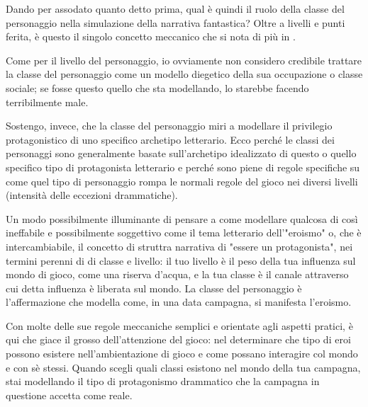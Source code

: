 Dando per assodato quanto detto prima, qual è quindi il ruolo della classe del personaggio nella simulazione della narrativa fantastica? Oltre a livelli e punti ferita, è questo il singolo concetto meccanico che si nota di più in \dnd{}.

Come per il livello del personaggio, io ovviamente non considero credibile trattare la classe del personaggio come un modello diegetico della sua occupazione o classe sociale; se fosse questo quello che sta modellando, lo starebbe facendo terribilmente male.

Sostengo, invece, che la classe del personaggio miri a modellare il privilegio protagonistico di uno specifico archetipo letterario. Ecco perché le classi dei personaggi sono generalmente basate sull'archetipo idealizzato di questo o quello specifico tipo di protagonista letterario e perché sono piene di regole specifiche su come quel tipo di personaggio rompa le normali regole del gioco nei diversi livelli (intensità delle eccezioni drammatiche).

Un modo possibilmente illuminante di pensare a come modellare qualcosa di così ineffabile e possibilmente soggettivo come il tema letterario dell'"eroismo" o, che è intercambiabile, il concetto di struttra narrativa di "essere un protagonista", nei termini perenni di \dnd{} di classe e livello: il tuo livello è il peso della tua influenza sul mondo di gioco, come una riserva d'acqua, e la tua classe è il canale attraverso cui detta influenza è liberata sul mondo. La classe del personaggio è l'affermazione che modella come, in una data campagna, si manifesta l'eroismo.

Con molte delle sue regole meccaniche semplici e orientate agli aspetti pratici, è qui che giace il grosso dell'attenzione del gioco: nel determinare che tipo di eroi possono esistere nell'ambientazione di gioco e come possano interagire col mondo e con sè stessi. Quando scegli quali classi esistono nel mondo della tua campagna, stai modellando il tipo di protagonismo drammatico che la campagna in questione accetta come reale.